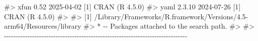 \documentclass[
  10pt,
  a4paper,
]{book}
\newenvironment{Shaded}{\begin{snugshade}}{\end{snugshade}}
\newcommand{\CommentTok}[1]{\textcolor[rgb]{0.37,0.37,0.37}{#1}}
\begin{document}
\begin{Shaded}
\begin{Highlighting}[]
\CommentTok{\#\textgreater{}  xfun            0.52    2025{-}04{-}02 [1] CRAN (R 4.5.0)}
\CommentTok{\#\textgreater{}  yaml            2.3.10  2024{-}07{-}26 [1] CRAN (R 4.5.0)}
\CommentTok{\#\textgreater{} }
\CommentTok{\#\textgreater{}  [1] /Library/Frameworks/R.framework/Versions/4.5{-}arm64/Resources/library}
\CommentTok{\#\textgreater{}  * {-}{-} Packages attached to the search path.}
\CommentTok{\#\textgreater{} }
\CommentTok{\#\textgreater{} {-}{-}{-}{-}{-}{-}{-}{-}{-}{-}{-}{-}{-}{-}{-}{-}{-}{-}{-}{-}{-}{-}{-}{-}{-}{-}{-}{-}{-}{-}{-}{-}{-}{-}{-}{-}{-}{-}{-}{-}{-}{-}{-}{-}{-}{-}{-}{-}{-}{-}{-}{-}{-}{-}{-}{-}{-}{-}{-}{-}{-}{-}{-}{-}{-}{-}{-}{-}{-}{-}{-}{-}{-}{-}{-}{-}{-}{-}}
\end{Highlighting}
\end{Shaded}




\backmatter
\end{document}
